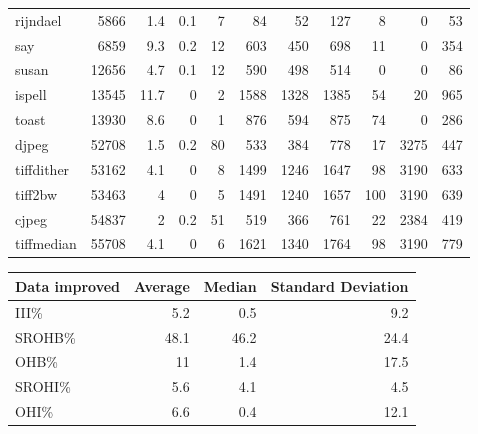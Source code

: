 \begin{tabular}{lrrrrrrrrrr}
 rijndael        &           5866 &      1.4 &    0.1 &    7 &     84 &         52 &          127 &     8 &     0 &    53 \\
 say             &           6859 &      9.3 &    0.2 &   12 &    603 &        450 &          698 &    11 &     0 &   354 \\
 susan           &          12656 &      4.7 &    0.1 &   12 &    590 &        498 &          514 &     0 &     0 &    86 \\
 ispell          &          13545 &     11.7 &    0   &    2 &   1588 &       1328 &         1385 &    54 &    20 &   965 \\
 toast           &          13930 &      8.6 &    0   &    1 &    876 &        594 &          875 &    74 &     0 &   286 \\
 djpeg           &          52708 &      1.5 &    0.2 &   80 &    533 &        384 &          778 &    17 &  3275 &   447 \\
 tiffdither      &          53162 &      4.1 &    0   &    8 &   1499 &       1246 &         1647 &    98 &  3190 &   633 \\
 tiff2bw         &          53463 &      4   &    0   &    5 &   1491 &       1240 &         1657 &   100 &  3190 &   639 \\
 cjpeg           &          54837 &      2   &    0.2 &   51 &    519 &        366 &          761 &    22 &  2384 &   419 \\
 tiffmedian      &          55708 &      4.1 &    0   &    6 &   1621 &       1340 &         1764 &    98 &  3190 &   779 \\
\hline
\end{tabular}\begin{tabular}{lrrr}
\hline
 Data improved   &   Average &   Median &   Standard Deviation \\
\hline
 III\%            &       5.2 &      0.5 &                  9.2 \\
 SROHB\%          &      48.1 &     46.2 &                 24.4 \\
 OHB\%            &      11   &      1.4 &                 17.5 \\
 SROHI\%          &       5.6 &      4.1 &                  4.5 \\
 OHI\%            &       6.6 &      0.4 &                 12.1 \\
\hline
\end{tabular}